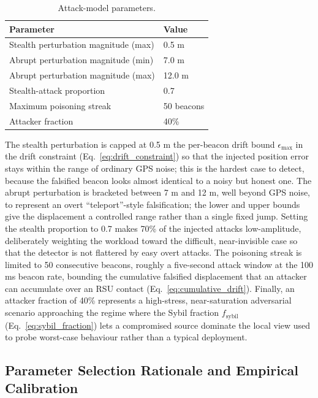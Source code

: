 \documentclass[12pt, a4paper]{report}
\begin{document}
\begin{table}[H]
\centering
\caption{Attack-model parameters.}
\label{tab:set-attack}
\begin{tabular}{|l|l|}
\hline
\textbf{Parameter} & \textbf{Value} \\
\hline
Stealth perturbation magnitude (max) & 0.5 m \\
\hline
Abrupt perturbation magnitude (min)  & 7.0 m \\
\hline
Abrupt perturbation magnitude (max)  & 12.0 m \\
\hline
Stealth-attack proportion            & 0.7 \\
\hline
Maximum poisoning streak             & 50 beacons \\
\hline
Attacker fraction                    & 40\% \\
\hline
\end{tabular}
\end{table}

The stealth perturbation is capped at 0.5 m the per-beacon drift bound
$\epsilon_{\max}$ in the drift constraint (Eq.~\ref{eq:drift_constraint})
so that the injected position error stays within the range of ordinary GPS
noise; this is the hardest case to detect, because the falsified beacon looks
almost identical to a noisy but honest one. The abrupt perturbation is bracketed
between 7 m and 12 m, well beyond GPS noise, to represent an overt
``teleport''-style falsification; the lower and upper bounds give the
displacement a controlled range rather than a single fixed jump. Setting the
stealth proportion to 0.7 makes 70\% of the injected attacks low-amplitude,
deliberately weighting the workload toward the difficult, near-invisible case so
that the detector is not flattered by easy overt attacks. The poisoning streak
is limited to 50 consecutive beacons, roughly a five-second attack window at the
100 ms beacon rate, bounding the cumulative falsified displacement that an attacker can accumulate over an RSU contact
(Eq.~\ref{eq:cumulative_drift}). Finally, an attacker fraction of 40\%
represents a high-stress, near-saturation adversarial scenario approaching
the regime where the Sybil fraction $f_{\mathrm{sybil}}$
(Eq.~\ref{eq:sybil_fraction}) lets a compromised source dominate the local
view used to probe worst-case behaviour rather than a typical deployment.


\subsection{Parameter Selection Rationale and Empirical Calibration}
\label{sec:param-rationale}
\end{document}
